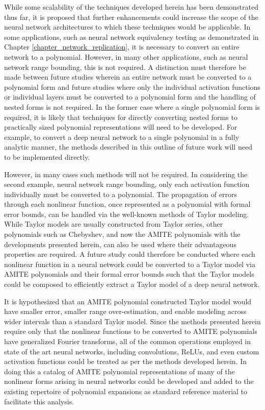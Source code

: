 While some scalability of the techniques developed herein has been demonstrated thus far, it is proposed that further enhancements could increase the scope of the neural network architectures to which these techniques would be applicable.  In some applications, such as neural network equivalency testing as demonstrated in Chapter \ref{chapter_network_replication}, it is necessary to convert an entire network to a polynomial.  However, in many other applications, such as neural network range bounding, this is not required.  A distinction must therefore be made between future studies wherein an entire network must be converted to a polynomial form and future studies where only the individual activation functions or individual layers must be converted to a polynomial form and the handling of nested forms is not required.  In the former case where a single polynomial form is required, it is likely that techniques for directly converting nested forms to practically sized polynomial representations will need to be developed.  For example, to convert a deep neural network to a single polynomial in a fully analytic manner, the methods described in this outline of future work will need to be implemented directly.

However, in many cases such methods will not be required.  In considering the second example, neural network range bounding, only each activation function individually must be converted to a polynomial.  The propagation of errors through each nonlinear function, once represented as a polynomial with formal error bounds, can be handled via the well-known methods of Taylor modeling.  While Taylor models are usually constructed from Taylor series, other polynomials such as Chebyshev, and now the AMITE polynomials with the developments presented herein, can also be used where their advantageous properties are required.  A future study could therefore be conducted where each nonlinear function in a neural network could be converted to a Taylor model via AMITE polynomials and their formal error bounds such that the Taylor models could be composed to efficiently extract a Taylor model of a deep neural network.

It is hypothesized that an AMITE polynomial constructed Taylor model would have smaller error, smaller range over-estimation, and enable modeling across wider intervals than a standard Taylor model.  Since the methods presented herein require only that the nonlinear functions to be converted to AMITE polynomials have generalized Fourier transforms, all of the common operations employed in state of the art neural networks, including convolutions, ReLUs, and even custom activation functions could be treated as per the methods developed herein.  In doing this a catalog of AMITE polynomial representations of many of the nonlinear forms arising in neural networks could be developed and added to the existing repertoire of polynomial expansions as standard reference material to facilitate this analysis.

